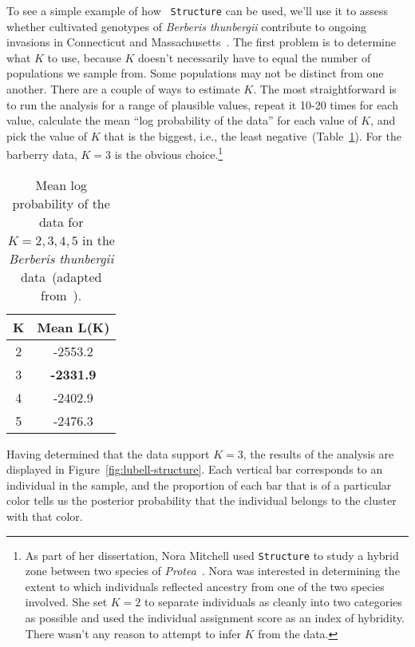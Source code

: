 \documentclass[12pt]{article}
\begin{document}
To see a simple example of how {\tt
  Structure} can be used, we'll
use it to assess whether cultivated genotypes of {\it Berberis
  thunbergii\/}
contribute to ongoing invasions in Connecticut and
Massachusetts~\cite{Lubell-etal-2008}. The first problem is to determine what $K$
to use, because $K$ doesn't necessarily have to equal the number of
populations we sample from. Some populations may not be distinct from
one another. There are a couple of ways to estimate $K$. The most
straightforward is to run the analysis for a range of plausible
values, repeat it 10-20 times for each value, calculate the mean ``log
probability of the data'' for each value of $K$, and pick the value of
$K$ that is the biggest, i.e., the least
negative~(Table~\ref{table:berberis-k}). For the barberry data, $K=3$
is the obvious choice.\footnote{As part of her dissertation, Nora
  Mitchell used {\tt Structure} to study a hybrid zone between two
  species of {\it Protea}~\cite{Mitchell-Holsinger-2018}. Nora was
  interested in determining the extent to which individuals reflected
  ancestry from one of the two species involved. She set $K=2$ to
  separate individuals as cleanly into two categories as possible and
  used the individual assignment score as an index of hybridity. There
  wasn't any reason to attempt to infer $K$ from the data.}

\begin{table}
\begin{center}
\begin{tabular}{cc}
\hline\hline
K & Mean L(K) \\
\hline
2 & -2553.2 \\
3 & {\bf -2331.9} \\
4 & -2402.9 \\
5 & -2476.3 \\
\hline
\end{tabular}
\end{center}
\caption{Mean log probability of the data for $K=2,3,4,5$ in the {\it
    Berberis thunbergii\/} data~(adapted
  from~\cite{Lubell-etal-2008}).}\label{table:berberis-k}
\end{table}

Having determined that the data support $K=3$, the results of the
analysis are displayed in Figure~\ref{fig:lubell-structure}. Each
vertical bar corresponds to an individual in the sample, and the
proportion of each bar that is of a particular color tells us the
posterior probability that the individual belongs to the cluster with
that color.
\end{document}
